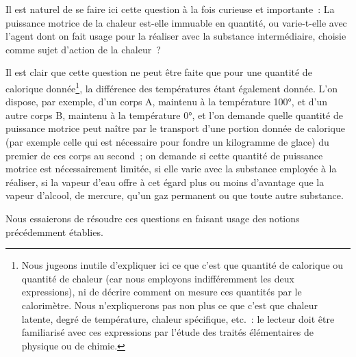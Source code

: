 \documentclass[french,twoside]{book} %
\begin{document}
Il est naturel de se faire ici cette question à la fois curieuse et importante : La puissance motrice de la chaleur est-elle immuable en quantité, ou varie-t-elle avec l’agent dont on fait usage pour la réaliser avec la substance intermédiaire, choisie comme sujet d’action de la chaleur ?\par
Il est clair que cette question ne peut être faite que pour une quantité de calorique donnée\footnote{Nous jugeons inutile d’expliquer ici ce que c’est que quantité de calorique ou quantité de chaleur (car nous employons indifféremment les deux expressions), ni de décrire comment on mesure ces quantités par le calorimètre. Nous n’expliquerons pas non plus ce que c’est que chaleur latente, degré de température, chaleur spécifique, etc. : le lecteur doit être familiarisé avec ces expressions par l’étude des traités élémentaires de physique ou de chimie.}, la différence des températures étant également donnée. L’on dispose, par exemple, d’un corps A, maintenu à la température 100°, et d’un autre corps B, maintenu à la température 0°, et l’on demande quelle quantité de puissance motrice peut naître par le transport d’une portion donnée de calorique (par exemple celle qui est nécessaire pour fondre un kilogramme de glace) du premier de ces corps au second ; on demande si cette quantité de puissance motrice est nécessairement limitée, si elle varie avec la substance employée à la réaliser, si la vapeur d’eau offre à cet égard plus ou moins d’avantage que la vapeur d’alcool, de mercure, qu’un gaz permanent ou que toute autre substance.\par
Nous essaierons de résoudre ces questions en faisant usage des notions précédemment établies.\par
\end{document}
